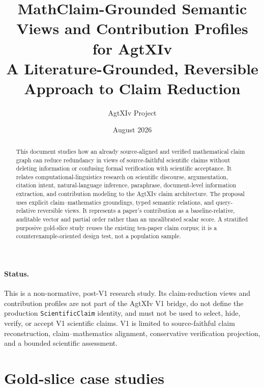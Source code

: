 \documentclass{article}
\title{MathClaim-Grounded Semantic Views and Contribution Profiles for AgtXIv\\\large A Literature-Grounded, Reversible Approach to Claim Reduction}
\author{AgtXIv Project}
\date{August 2026}
\begin{document}
\maketitle

\paragraph{Status.}
This is a non-normative, post-V1 research study. Its claim-reduction views and contribution profiles are not part of the AgtXIv V1 bridge, do not define the production \texttt{ScientificClaim} identity, and must not be used to select, hide, verify, or accept V1 scientific claims. V1 is limited to source-faithful claim reconstruction, claim--mathematics alignment, conservative verification projection, and a bounded scientific assessment.

\begin{abstract}
This document studies how an already source-aligned and verified mathematical claim graph can reduce redundancy in views of source-faithful scientific claims without deleting information or confusing formal verification with scientific acceptance. It relates computational-linguistics research on scientific discourse, argumentation, citation intent, natural-language inference, paraphrase, document-level information extraction, and contribution modeling to the AgtXIv claim architecture. The proposal uses explicit claim--mathematics groundings, typed semantic relations, and query-relative reversible views. It represents a paper's contribution as a baseline-relative, auditable vector and partial order rather than an uncalibrated scalar score. A stratified purposive gold-slice study reuses the existing ten-paper claim corpus; it is a counterexample-oriented design test, not a population sample.
\end{abstract}
\tableofcontents









\appendix
\section{Gold-slice case studies}\label{app:cases}








\end{document}
